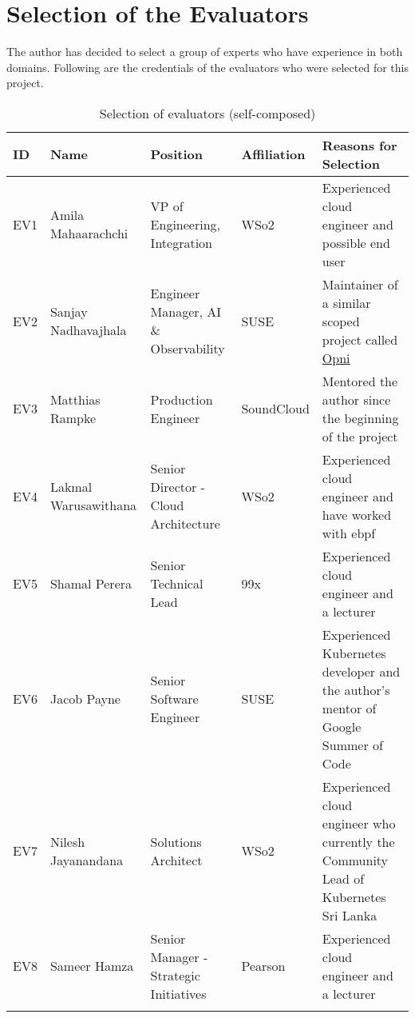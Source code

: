 \section{Selection of the Evaluators}

The author has decided to select a group of experts who have experience in both domains. Following are the credentials of the evaluators who were selected for this project. 



\begin{longtable}{|p{8mm}|p{28mm}|p{35mm}|p{21mm}|p{50mm}|}
  \hline
  \textbf{ID} & \textbf{Name} & \textbf{Position} & \textbf{Affiliation} & \textbf{Reasons for Selection} \\ \hline
  EV1 & Amila Mahaarachchi & VP of Engineering, Integration & WSo2 & Experienced cloud engineer  and possible end user \\ \hline
  EV2 & Sanjay Nadhavajhala & Engineer Manager, AI \& Observability & SUSE & Maintainer of a similar scoped project called \href{https://opni.io/}{Opni} \\ \hline
  EV3 & Matthias Rampke & Production Engineer & SoundCloud & Mentored the author since the beginning of the project \\ \hline
  EV4 & Lakmal Warusawithana & Senior Director - Cloud Architecture & WSo2 & Experienced cloud engineer and have worked with \ac{ebpf} \\ \hline
  EV5 & Shamal Perera & Senior Technical Lead & 99x & Experienced cloud engineer and a lecturer \\ \hline
  EV6 & Jacob Payne & Senior Software Engineer & SUSE & Experienced Kubernetes developer and the author’s mentor of Google Summer of Code \\ \hline
  EV7 & Nilesh Jayanandana & Solutions Architect & WSo2 & Experienced cloud engineer who currently the Community Lead of Kubernetes Sri Lanka \\ \hline
  EV8 & Sameer Hamza & Senior Manager - Strategic Initiatives
  & Pearson & Experienced cloud engineer and a lecturer \\ \hline

  \caption{Selection of evaluators (self-composed)}
\end{longtable}

